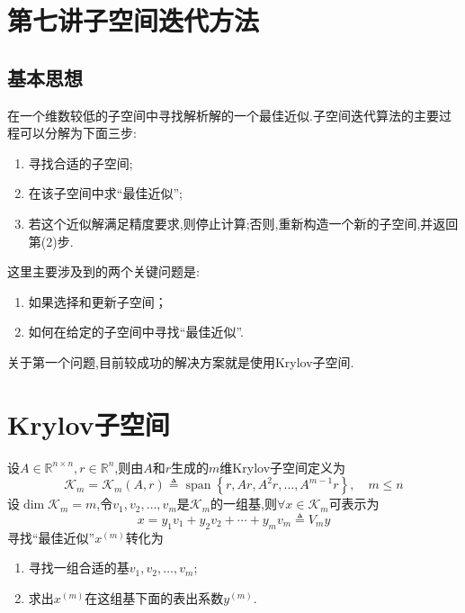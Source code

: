 \documentclass[12pt,a4paper]{article}
\title{}
\author{作者}
\date{\chntoday}
\begin{document}
\maketitle
\newpage
\section*{\color{blue}第七讲\quad 子空间迭代方法}
\subsection*{基本思想}
在一个{\color{blue}维数较低的子空间}中寻找解析解的一个{\color{blue}最佳近似}.子空间迭代算法的主要过程可以分解为下面三步:
\begin{enumerate}[(1)]
\item 寻找合适的子空间;\\
\item 在该子空间中求“最佳近似”;\\
\item 若这个近似解满足精度要求,则停止计算;否则,重新构造一个新的子空间,并返回第(2)步.
\end{enumerate}
这里主要涉及到的{\color{blue}两个关键问题}是:
\begin{enumerate}
\item 如果选择和更新子空间；
\item 如何在给定的子空间中寻找“最佳近似”.
\end{enumerate}
关于第一个问题,目前较成功的解决方案就是使用{\color{blue}Krylov子空间}.\\
\section{\color{blue}Krylov子空间}
设$A \in \mathbb{R}^{n \times n}, r \in \mathbb{R}^{n}$,则由$A$和$r$生成的$m$维{\color{blue}Krylov子空间}定义为
$$
\boxed{\mathcal{K}_{m}=\mathcal{K}_{m}(A, r) \triangleq \operatorname{span}\left\{r, A r, A^{2} r, \ldots, A^{m-1} r\right\}, \quad m \leq n}
$$
设$\operatorname{dim} \mathcal{K}_{m}=m$,令$v_{1}, v_{2}, \ldots, v_{m}$是$\mathcal{K}_{m}$的一组基,则$\forall x \in \mathcal{K}_{m}$可表示为
$$x=y_{1} v_{1}+y_{2} v_{2}+\cdots+y_{m} v_{m} \triangleq V_{m} y$$
{\color{blue}寻找“最佳近似”$x^{(m)}$}转化为
\begin{enumerate}
\item 寻找一组合适的基$v_{1}, v_{2}, \ldots, v_{m}$;
\item 求出$x^{(m)}$在这组基下面的表出系数$y^{(m)}$.
\end{enumerate}
\end{document}
